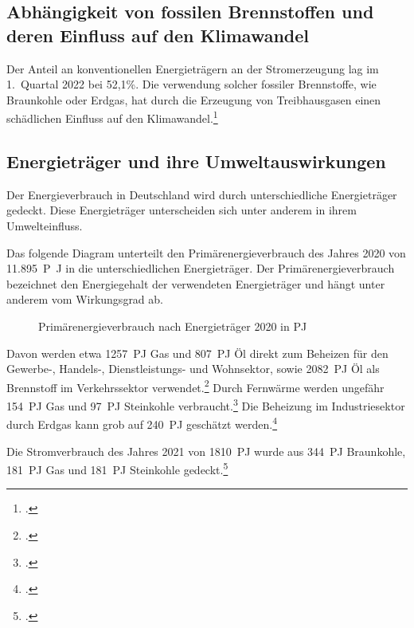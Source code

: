 \documentclass[12pt]{article}
\begin{document}
\subsection{Abhängigkeit von fossilen Brennstoffen und deren Einfluss auf den Klimawandel}

Der Anteil an konventionellen Energieträgern an der Stromerzeugung lag im 1.\ Quartal 2022 bei 52,1\%.
Die verwendung solcher fossiler Brennstoffe, wie Braunkohle oder Erdgas, hat durch die Erzeugung von
Treibhausgasen einen schädlichen Einfluss auf den Klimawandel.\footcite{wilkeErneuerbareUndKonventionelle2013}

\subsection{Energieträger und ihre Umweltauswirkungen}
Der Energieverbrauch in Deutschland wird durch unterschiedliche Energieträger gedeckt.
Diese Energieträger unterscheiden sich unter anderem in ihrem Umwelteinfluss.

Das folgende Diagram unterteilt den Primärenergieverbrauch des Jahres 2020 von
\qty{11.895}{P\joule}
in die unterschiedlichen Energieträger.
Der Primärenergieverbrauch bezeichnet den Energiegehalt der verwendeten Energieträger und
hängt unter anderem vom Wirkungsgrad ab.

\begin{figure}[!h]
    \caption{Primärenergieverbrauch nach Energieträger 2020 in
        \unit{PJ}}
\end{figure}

Davon werden etwa \qty{1257}{PJ} Gas und \qty{807}{PJ} Öl direkt zum Beheizen für den Gewerbe-, Handels-,
Dienstleistungs- und Wohnsektor, sowie \qty{2082}{PJ} Öl als Brennstoff im Verkehrssektor verwendet.\footcite{Energieflussbild2020PJLang}
Durch Fernwärme werden ungefähr \qty{154}{PJ} Gas und \qty{97}{PJ} Steinkohle verbraucht.\footcite{WieKannTransformation}
Die Beheizung im Industriesektor durch Erdgas kann grob auf \qty{240}{PJ} geschätzt werden.\footcite{Industrie}

Die Stromverbrauch des Jahres 2021 von \qty{1810}{PJ} wurde aus \qty{344}{PJ} Braunkohle, \qty{181}{PJ} Gas
und \qty{181}{PJ} Steinkohle gedeckt.\footcite{SMARDEntwicklungenIm}
\end{document}
